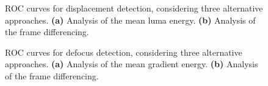 \documentclass{llncs}
\begin{document}
\begin{figure}[htb]
\centering
{}
\caption{ROC curves for displacement detection, considering three alternative approaches. \textbf{(a)} Analysis of the mean luma energy. \textbf{(b)} Analysis of the frame differencing.}
\label{fig:ROCdisplacement}
\end{figure}
\begin{figure}[htb]
\centering
{}
\caption{ROC curves for defocus detection, considering three alternative approaches. \textbf{(a)} Analysis of the mean gradient energy. \textbf{(b)} Analysis of the frame differencing.}
\label{fig:ROCdisplacement}
\label{fig:ROCdefocus}
\end{figure}
\end{document}
